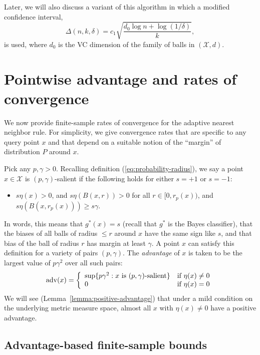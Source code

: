 \documentclass{article}
\def\X{{\mathcal X}}
\def\adv{{\rm adv}}
\newcommand{\new}[1]{\color{red} #1}
\begin{document}
Later, we will also discuss a variant of this algorithm in which a modified confidence interval,
\begin{equation}
\Delta(n,k,\delta) = c_1 \sqrt{\frac{d_0 \log n + \log (1/\delta)}{k}},
\label{eq:delta-modified}
\end{equation}
is used, where $d_0$ is the VC dimension of the family of balls in $(\X,d)$. 

\section{Pointwise advantage and rates of convergence}\label{sec:gen1}

We now provide finite-sample rates of convergence for the adaptive nearest neighbor rule. For simplicity, we give convergence rates that are specific to any query point $x$ and that depend on a suitable notion of the ``margin'' of distribution $P$ around $x$.

Pick any $p, \gamma > 0$. Recalling definition
(\ref{eq:probability-radius}), we say a point $x \in \X$ is $(p,
\gamma)$-salient
if the following holds for either $s=+1$ or $s=-1$:
\begin{itemize}
\item $s \eta(x) > 0$, and $s \eta(B(x,r)) > 0$ for all $r \in
  [0,r_p(x))$, and $s \eta(B(x,r_p(x))) \geq s \gamma$.
\end{itemize}
{\new{In words, this means that $g^*(x)=s$ (recall that $g^*$ is the Bayes classifier),
that the biases of all balls of radius $\leq r$ around $x$ have the same sign like $s$, and that
bias of the ball of radius $r$ has margin at least $\gamma$.}}
A point $x$ can satisfy this definition for a variety of pairs $(p,\gamma)$. The {\it advantage} of $x$ is taken to be the largest value of $p\gamma^2$ over all such pairs:
\begin{equation}
\adv(x) = 
\left\{
\begin{array}{ll}
\sup \{ p \gamma^2: \mbox{$x$ is $(p,\gamma)$-salient}\} & \mbox{if $\eta(x) \neq 0$} \\
0 & \mbox{if $\eta(x) = 0$}
\end{array}
\right.
\label{eq:advantage}
\end{equation}
We will see (Lemma~\ref{lemma:positive-advantage}) that under a mild condition on the underlying metric measure space, almost all $x$ with $\eta(x) \neq 0$ have a positive advantage.

\subsection{Advantage-based finite-sample bounds}
\end{document}

